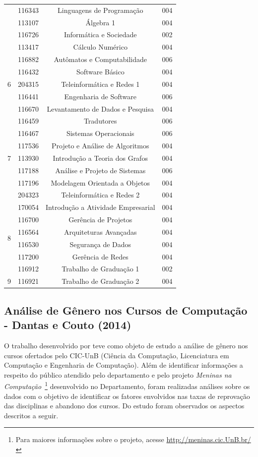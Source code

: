 \begin{longtable}{c|ccc}
		& 116343 & Linguagens de Programação & 004\\
		& 113107 & Álgebra 1 & 004\\
		& 116726 & Informática e Sociedade & 002\\
		& 113417 & Cálculo Numérico & 004\\
		\hline
		\multirow{5}{*}{6} & 116882 & Autômatos e Computabilidade & 006\\
		& 116432 & Software Básico & 004\\
		& 204315 & Teleinformática e Redes 1 & 004\\ 
		& 116441 & Engenharia de Software & 006\\
		& 116670 & Levantamento de Dados e Pesquisa & 004\\
		\hline
		\multirow{7}{*}{7} & 116459 & Tradutores & 006\\
		& 116467 & Sistemas Operacionais & 006\\
		& 117536 & Projeto e Análise de Algoritmos & 004\\ 
		& 113930 & Introdução a Teoria dos Grafos & 004\\
		& 117188 & Análise e Projeto de Sistemas & 006\\
		& 117196 & Modelagem Orientada a Objetos & 004\\
		& 204323 & Teleinformática e Redes 2 & 004\\
		\hline
		\multirow{6}{*}{8} & 170054 & Introdução a Atividade Empresarial & 004\\
		& 116700 & Gerência de Projetos & 004\\
		& 116564 & Arquiteturas Avançadas & 004\\ 
		& 116530 & Segurança de Dados & 004\\
		& 117200 & Gerência de Redes & 004\\
		& 116912 & Trabalho de Graduação 1 & 002\\
		\hline
		9 & 116921 & Trabalho de Graduação 2 & 004\\
		\hline
\end{longtable}


\subsection {Análise de Gênero nos Cursos de Computação - Dantas e Couto (2014)} \label{2title53}

O trabalho desenvolvido por \citet{dantas2014} teve como objeto de estudo a análise de gênero nos cursos ofertados pelo CIC-UnB (Ciência da Computação, Licenciatura em Computação e Engenharia de Computação). Além de identificar informações a respeito do público atendido pelo departamento e pelo projeto \textit{Meninas na Computação}~\footnote{Para maiores informações sobre o projeto, acesse \url{http://meninas.cic.UnB.br/}} desenvolvido no Departamento, foram realizadas análises sobre os dados com o objetivo de identificar os fatores envolvidos nas taxas de reprovação das disciplinas e abandono dos cursos. Do estudo foram observados os aspectos descritos a seguir.

